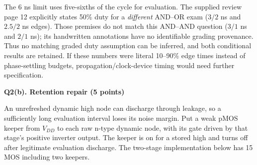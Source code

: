 \documentclass[10pt]{article}
\newcommand{\qheading}[1]{\par\medskip\textbf{#1}\par}
\begin{document}
The 6 ns limit uses five-sixths of the cycle for evaluation. The supplied review page 12 explicitly states 50\% duty for a \emph{different} AND--OR exam ($3/2$ ns and $2.5/2$ ns edges). Those premises do not match this AND--AND question ($3/1$ ns and $2/1$ ns); its handwritten annotations have no identifiable grading provenance. Thus no matching graded duty assumption can be inferred, and both conditional results are retained. If these numbers were literal 10--90\% edge times instead of phase-settling budgets, propagation/clock-device timing would need further specification.
\qheading{Q2(b). Retention repair (5 points)}
An unrefreshed dynamic high node can discharge through leakage, so a sufficiently long evaluation interval loses its noise margin. Put a weak pMOS keeper from $V_{DD}$ to each raw n-type dynamic node, with its gate driven by that stage's positive inverter output. The keeper is on for a stored high and turns off after legitimate evaluation discharge. The two-stage implementation below has 15 MOS including two keepers.
\end{document}
